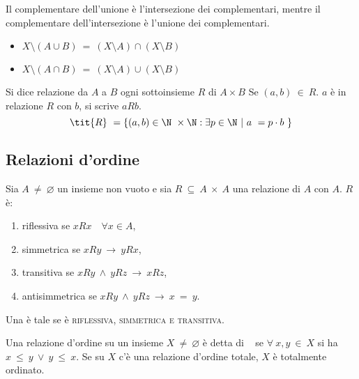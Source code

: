 \documentclass[../appunti.tex]{subfiles}
\begin{document}
\begin{esem}

Il complementare dell'unione è l'intersezione dei complementari, mentre il complementare dell'intersezione è l'unione dei complementari.

	\begin{itemize}
	\item $ X \setminus (A \cup B)\ =\ (X \setminus A) \cap(X \setminus B) $
	\item $ X \setminus (A \cap B)\ =\ (X \setminus A) \cup (X \setminus B) $
        \end{itemize}
\end{esem}

\begin{dimo}
	Si dice relazione da $A$ a $B$ ogni sottoinsieme $R$ di $A\times B$ Se $(a,b)\ \in\ R$.
	$a$ è in relazione $R$ con $b$, si scrive $aRb$. 
	\begin{equation} 
	\tit{R}\ = \{ (a,b) \in \N\ \times \N: \exists p \in \N\ |\ a\ = p \cdot b\ \}
	\end{equation}
\end{dimo}

\subsection{Relazioni d'ordine}
Sia $A\ \neq\ \varnothing$ un insieme non vuoto e sia $R\ \subseteq\ A\ \times\ A$ una relazione di $A$ con $A$. $R$ è:

\begin{enumerate}
	\item riflessiva se $xRx \quad \forall x \in A$,
	\item simmetrica se $xRy\ \rightarrow\ yRx$,
	\item transitiva se $xRy\ \land\ yRz\ \rightarrow\ xRz$,
	\item antisimmetrica se $xRy\ \land\ yRz\ \rightarrow\ x\ =\ y$.
\end{enumerate}
Una  è tale se è \textsc{riflessiva, simmetrica e transitiva}.

\begin{defn} 
 	Una relazione d'ordine su un insieme $X\ \neq \ \varnothing $ è detta di   se $\forall\ x,y\ \in\ X $ si ha $x\ \leq\ y\ \lor\ y\ \leq\ x$. Se su $X$ c'è una relazione d'ordine totale, $X$ è totalmente ordinato. 
\end{defn}
\end{document}
